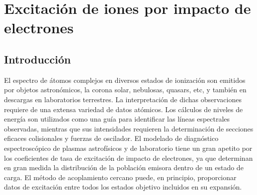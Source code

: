 \chapter{Excitación de iones por impacto de electrones}

\section{Introducción}
\label{sec:intro}

El espectro de átomos complejos en diversos estados de ionización son 
emitidos por objetos astronómicos, la corona solar, nebulosas, quasars, 
etc, y también en descargas en laboratorios terrestres. La interpretación
de dichas observaciones requiere de una extensa variedad de datos 
atómicos. Los cálculos de niveles de energía son utilizados como una guía
para identificar las líneas espectrales observadas, mientras que sus 
intensidades requieren la determinación de secciones eficaces 
colisionales y fuerzas de oscilador. 
El modelado de diagnóstico espectroscópico de plasmas astrofísicos y de 
laboratorio tiene un gran apetito por los coeficientes de tasa de 
excitación de impacto de electrones, ya que determinan en gran medida la 
distribución de la población emisora dentro de un estado de carga. El 
método de acoplamiento cercano puede, en principio, proporcionar datos 
de excitación entre todos los estados objetivo incluidos en su expansión.

